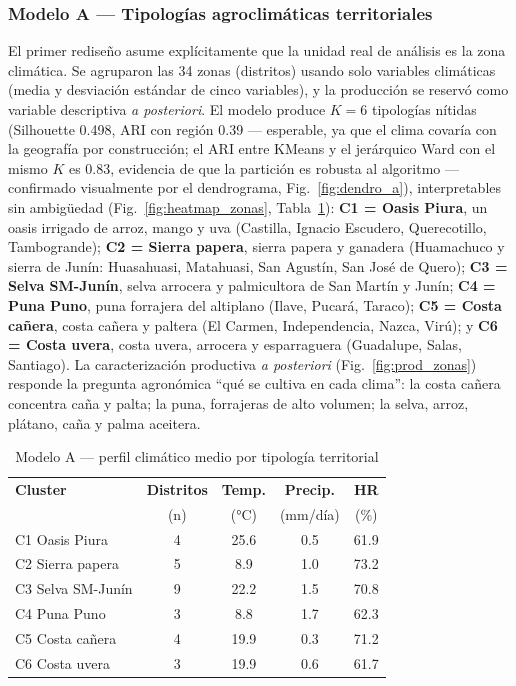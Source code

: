 \documentclass[conference]{IEEEtran}
\begin{document}
\subsubsection{Modelo A --- Tipologías agroclimáticas territoriales}
El primer rediseño asume explícitamente que la unidad real de análisis es la zona climática. Se agruparon las 34 zonas (distritos) usando solo variables climáticas (media y desviación estándar de cinco variables), y la producción se reservó como variable descriptiva \emph{a posteriori}. El modelo produce $K=6$ tipologías nítidas (Silhouette 0.498, ARI con región 0.39 --- esperable, ya que el clima covaría con la geografía por construcción; el ARI entre KMeans y el jerárquico Ward con el mismo $K$ es 0.83, evidencia de que la partición es robusta al algoritmo --- confirmado visualmente por el dendrograma, Fig.~\ref{fig:dendro_a}), interpretables sin ambigüedad (Fig.~\ref{fig:heatmap_zonas}, Tabla~\ref{tab:modelo_a}): \textbf{C1 = Oasis Piura}, un oasis irrigado de arroz, mango y uva (Castilla, Ignacio Escudero, Querecotillo, Tambogrande); \textbf{C2 = Sierra papera}, sierra papera y ganadera (Huamachuco y sierra de Junín: Huasahuasi, Matahuasi, San Agustín, San José de Quero); \textbf{C3 = Selva SM-Junín}, selva arrocera y palmicultora de San Martín y Junín; \textbf{C4 = Puna Puno}, puna forrajera del altiplano (Ilave, Pucará, Taraco); \textbf{C5 = Costa cañera}, costa cañera y paltera (El Carmen, Independencia, Nazca, Virú); y \textbf{C6 = Costa uvera}, costa uvera, arrocera y esparraguera (Guadalupe, Salas, Santiago). La caracterización productiva \emph{a posteriori} (Fig.~\ref{fig:prod_zonas}) responde la pregunta agronómica ``qué se cultiva en cada clima'': la costa cañera concentra caña y palta; la puna, forrajeras de alto volumen; la selva, arroz, plátano, caña y palma aceitera.

\begin{table}[h]
\centering
\caption{Modelo A --- perfil climático medio por tipología territorial}
\label{tab:modelo_a}
\small
\begin{tabular}{l c c c c}
\toprule
\textbf{Cluster} & \textbf{Distritos} & \textbf{Temp.} & \textbf{Precip.} & \textbf{HR} \\
 & (n) & (°C) & (mm/día) & (\%) \\
\midrule
C1 Oasis Piura & 4 & 25.6 & 0.5 & 61.9 \\
C2 Sierra papera & 5 & 8.9 & 1.0 & 73.2 \\
C3 Selva SM-Junín & 9 & 22.2 & 1.5 & 70.8 \\
C4 Puna Puno & 3 & 8.8 & 1.7 & 62.3 \\
C5 Costa cañera & 4 & 19.9 & 0.3 & 71.2 \\
C6 Costa uvera & 3 & 19.9 & 0.6 & 61.7 \\
\bottomrule
\end{tabular}
\end{table}
\end{document}
